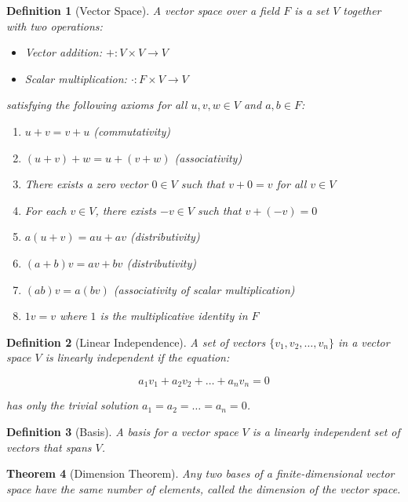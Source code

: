 \documentclass[12pt]{article}
\newif\ifDarkMode
\newcommand{\eqcolor}[1]{\ifDarkMode\textcolor{draculaPurple}{#1}\else#1\fi}
\newcommand{\varcolor}[1]{\ifDarkMode\textcolor{draculaGreen}{#1}\else#1\fi}
\newtheorem{theorem}{Theorem}[section]
\newtheorem{definition}[theorem]{Definition}
\begin{document}
\begin{definition}[Vector Space]
A vector space over a field $\varcolor{F}$ is a set $\varcolor{V}$ together with two operations:
\begin{itemize}
    \item Vector addition: $\eqcolor{+: V \times V \to V}$
    \item Scalar multiplication: $\eqcolor{\cdot: F \times V \to V}$
\end{itemize}
satisfying the following axioms for all $\varcolor{u, v, w \in V}$ and $\varcolor{a, b \in F}$:
\begin{enumerate}
    \item $\eqcolor{u + v = v + u}$ (commutativity)
    \item $\eqcolor{(u + v) + w = u + (v + w)}$ (associativity)
    \item There exists a zero vector $\varcolor{0 \in V}$ such that $\eqcolor{v + 0 = v}$ for all $\varcolor{v \in V}$
    \item For each $\varcolor{v \in V}$, there exists $\varcolor{-v \in V}$ such that $\eqcolor{v + (-v) = 0}$
    \item $\eqcolor{a(u + v) = au + av}$ (distributivity)
    \item $\eqcolor{(a + b)v = av + bv}$ (distributivity)
    \item $\eqcolor{(ab)v = a(bv)}$ (associativity of scalar multiplication)
    \item $\eqcolor{1v = v}$ where $\varcolor{1}$ is the multiplicative identity in $\varcolor{F}$
\end{enumerate}
\end{definition}

\begin{definition}[Linear Independence]
A set of vectors $\{\varcolor{v_1, v_2, \ldots, v_n}\}$ in a vector space $\varcolor{V}$ is linearly independent if the equation:

\[
\eqcolor{a_1v_1 + a_2v_2 + \ldots + a_nv_n = 0}
\]

has only the trivial solution $\eqcolor{a_1 = a_2 = \ldots = a_n = 0}$.
\end{definition}

\begin{definition}[Basis]
A basis for a vector space $\varcolor{V}$ is a linearly independent set of vectors that spans $\varcolor{V}$.
\end{definition}

\begin{theorem}[Dimension Theorem]
Any two bases of a finite-dimensional vector space have the same number of elements, called the dimension of the vector space.
\end{theorem}
\end{document}
